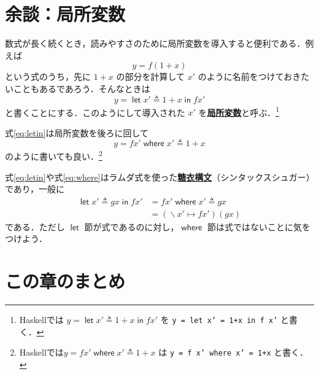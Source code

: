 \documentclass[a5paper,twoside,fleqn,draft]{jsbook}
\newcommand{\programminglanguage}[1]{\textsf{#1}}
\newcommand{\haskell}{\programminglanguage{Haskell}}
\newcommand{\keyword}[1]{{\underline{\textbf{#1}}}}
\newcommand{\code}[1]{\texttt{#1}}
\newcommand{\mKeyword}[1]{\mathsf{#1}}
\newcommand{\mIfKeyword}{\mKeyword{if}}
\newcommand{\mInKeyword}{\mKeyword{in}}
\newcommand{\mLetKeyword}{\mKeyword{let}}
\newcommand{\mOtherwiseKeyword}{\mKeyword{otherwise}}
\newcommand{\mWhereKeyword}{\mKeyword{where}}
\DeclareMathOperator{\mIf}{\mIfKeyword}
\DeclareMathOperator{\mLet}{\mLetKeyword}
\DeclareMathOperator{\mLetIn}{\mInKeyword}
\DeclareMathOperator{\mOtherwise}{\mOtherwiseKeyword}
\DeclareMathOperator{\mWhere}{\mWhereKeyword}
\DeclareMathOperator{\mLambda}{\backslash}
\DeclareMathOperator{\mLambdaArrow}{\mapsto}
\DeclareMathOperator{\mLetEq}{\triangleq}
\DeclareMathOperator{\mWhereEq}{\mLetEq}
\begin{document}

\section{余談：局所変数}

数式が長く続くとき，読みやすさのために局所変数を導入すると便利である．例えば
\begin{equation}
  y
  =f(1+x)
\end{equation}
という式のうち，先に $1+x$ の部分を計算して $x'$ のように名前をつけておきたいこともあるであろう．そんなときは
\begin{equation}
  \label{eq:letin}
  y
  =\mLet x'
  \mLetEq 1+x
  \mLetIn fx'
\end{equation}
と書くことにする．このようにして導入された $x'$ を\keyword{局所変数}と呼ぶ．\footnote{\haskell では $y=\mLet x'\mLetEq1+x\mLetIn fx'$ を \code{y = let x' = 1+x in f x'} と書く．}

式\eqref{eq:letin}は局所変数を後ろに回して
\begin{equation}
  \label{eq:where}
  y=fx'\mWhere x'\mWhereEq 1+x
\end{equation}
のように書いても良い．\footnote{\haskell では$y=fx'\mWhere x'\mWhereEq1+x$ は \code{y = f x' where x' = 1+x} と書く．}

式\eqref{eq:letin}や式\eqref{eq:where}はラムダ式を使った\keyword{糖衣構文}（シンタックスシュガー）であり，一般に
\begin{align}
  \mLet x'\mLetEq gx\mLetIn fx'
  &=fx'\mWhere x'\mWhereEq gx\\
  &=(\mLambda x'\mLambdaArrow fx')(gx)
\end{align}
である．ただし $\mLet$ 節が式であるのに対し，$\mWhere$ 節は式ではないことに気をつけよう．

\section{この章のまとめ}
\end{document}
